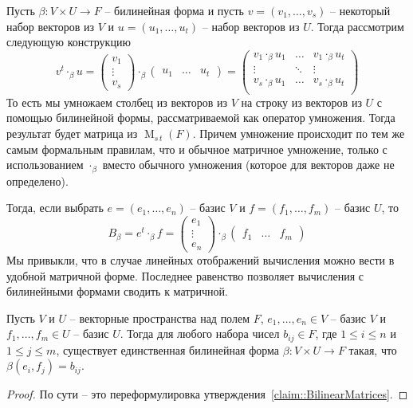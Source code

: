 Пусть $\beta\colon V\times U\to F$ -- билинейная форма и пусть $v = (v_1,\ldots,v_s)$ -- некоторый набор векторов из $V$ и $u = (u_1,\ldots,u_t)$ -- набор векторов из $U$.
Тогда рассмотрим следующую конструкцию
\[
v^t\cdot_\beta u = 
\begin{pmatrix}
{v_1}\\{\vdots}\\{v_s}
\end{pmatrix}
\cdot_\beta
\begin{pmatrix}
{u_1}&{\ldots}&{u_t}
\end{pmatrix}
=
\begin{pmatrix}
{v_1\cdot_\beta u_1}&{\ldots}&{v_1\cdot_\beta u_t}\\
{\vdots}&{\ddots}&{\vdots}\\
{v_s\cdot_\beta u_1}&{\ldots}&{v_s\cdot_\beta u_t}\\
\end{pmatrix}
\]
То есть мы умножаем столбец из векторов из $V$ на строку из векторов из $U$ с помощью билинейной формы, рассматриваемой как оператор умножения.
Тогда результат будет матрица из $\operatorname{M}_{s\,t}(F)$.
Причем умножение происходит по тем же самым формальным правилам, что и обычное матричное умножение, только с использованием $\cdot_\beta$ вместо обычного умножения (которое для векторов даже не определено).

Тогда, если выбрать $e = (e_1,\ldots,e_n)$ -- базис $V$ и $f = (f_1,\ldots,f_m)$ -- базис $U$, то 
\[
B_\beta = e^t\cdot_\beta f = 
\begin{pmatrix}
{e_1}\\{\vdots}\\{e_n}
\end{pmatrix}
\cdot_\beta
\begin{pmatrix}
{f_1}&{\ldots}&{f_m}
\end{pmatrix}
\]
Мы привыкли, что в случае линейных отображений вычисления можно вести в удобной матричной форме.
Последнее равенство позволяет вычисления с билинейными формами сводить к матричной.

\begin{claim}
Пусть $V$ и $U$ -- векторные пространства над полем $F$, $e_1,\ldots,e_n \in V$ -- базис $V$ и $f_1,\ldots,f_m\in U$ -- базис $U$.
Тогда для любого набора чисел $b_{ij}\in F$, где $1\leqslant i \leqslant n$ и $1\leqslant j \leqslant m$, существует единственная билинейная форма $\beta\colon V\times U\to F$ такая, что $\beta(e_i,f_j) = b_{ij}$.
\end{claim}
\begin{proof}
По сути -- это переформулировка утверждения~\ref{claim::BilinearMatrices}.
\end{proof}

